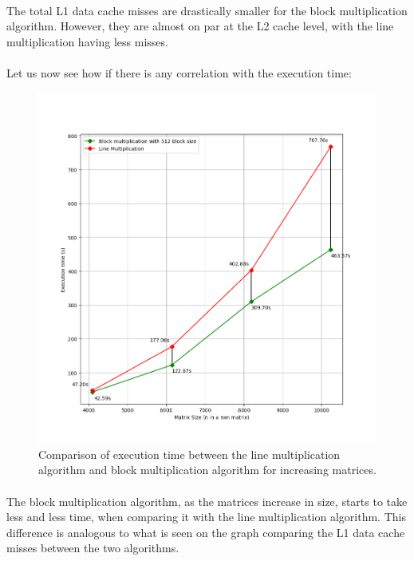 \documentclass{report}
\begin{document}
				\paragraph{}The total L1 data cache misses are drastically smaller for the block multiplication algorithm. However, they are almost on par at the L2 cache level, with the line multiplication having less misses.
				
				\paragraph{}Let us now see how if there is any correlation with the execution time:
				
				\begin{figure}[H]
					\begin{adjustbox}{center}
						\includegraphics[scale=0.5]{cpp_line_block_comparison.png}
					\end{adjustbox}
					\caption{Comparison of execution time between the line multiplication algorithm and block multiplication algorithm for increasing matrices.}
				\end{figure}
			
				\paragraph{}The block multiplication algorithm, as the matrices increase in size, starts to take less and less time, when comparing it with the line multiplication algorithm. This difference is analogous to what is seen on the graph comparing the L1 data cache misses between the two algorithms.
				
\end{document}
